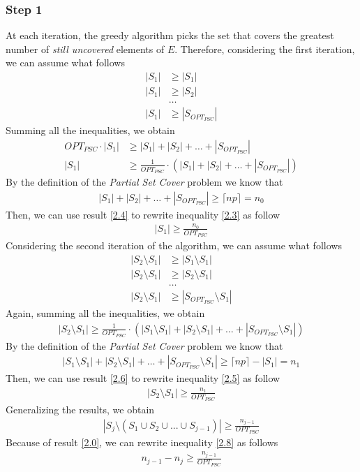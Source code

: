 \documentclass[a4paper,11pt]{article}
\begin{document}
\subsubsection{Step 1}
At each iteration, the greedy algorithm picks the set that covers the greatest number of \textit{still uncovered} elements of $E$. Therefore, considering the first iteration, we can assume what follows
\begin{align*}
|S_1| &\geq |S_{1}|\\
|S_1| &\geq |S_{2}|\\
&\dots\\
|S_1| &\geq |S_{OPT_{PSC}}|
\end{align*}
Summing all the inequalities, we obtain
\begin{align}
OPT_{PSC} \cdot |S_1| &\geq |S_{1}| + |S_{2}| + \dots + |S_{OPT_{PSC}}|\nonumber\\
|S_1| &\geq \frac{1}{OPT_{PSC}}\cdot(|S_{1}| + |S_{2}| + \dots + |S_{OPT_{PSC}}|) \label{2.3}
\end{align}
By the definition of the \textit{Partial Set Cover} problem we know that 
\begin{align}
|S_{1}| + |S_{2}| + \dots + |S_{OPT_{PSC}}| \geq \lceil np \rceil = n_0 \label{2.4}
\end{align}
Then, we can use result \ref{2.4} to rewrite inequality \ref{2.3} as follow
\begin{align*}
|S_1| \geq \frac{n_0}{OPT_{PSC}}
\end{align*}
Considering the second iteration of the algorithm, we can assume what follows
\begin{align*}
|S_2 \setminus S_1| &\geq |S_{1} \setminus S_1|\\
|S_2 \setminus S_1| &\geq |S_{2} \setminus S_1|\\
&\dots\\
|S_2 \setminus S_1| &\geq |S_{OPT_{PSC}} \setminus S_1|
\end{align*}
Again, summing all the inequalities, we obtain
\begin{align}
|S_2 \setminus S_1| \geq \frac{1}{OPT_{PSC}} \cdot (|S_{1} \setminus S_1| + |S_{2} \setminus S_1| + \dots + |S_{OPT_{PSC}} \setminus S_1|) \label{2.5}
\end{align}
By the definition of the \textit{Partial Set Cover} problem we know that 
\begin{align}
|S_{1} \setminus S_1| + |S_{2} \setminus S_1| + \dots + |S_{OPT_{PSC}} \setminus S_1| \geq \lceil np \rceil - |S_1| = n_1 \label{2.6}
\end{align}
Then, we can use result \ref{2.6} to rewrite inequality \ref{2.5} as follow
\begin{align*}
|S_2 \setminus S_1| \geq \frac{n_1}{OPT_{PSC}}
\end{align*}
Generalizing the results, we obtain
\begin{align}
|S_j \setminus (S_1 \cup S_2 \cup ... \cup S_{j-1})| \geq \frac{n_{j-1}}{OPT_{PSC}} \label{2.8}
\end{align}
Because of result \ref{2.0}, we can rewrite inequality \ref{2.8} as follows
\begin{align}
n_{j-1} - n_j \geq \frac{n_{j-1}}{OPT_{PSC}} \label{2.9}
\end{align}
\end{document}
